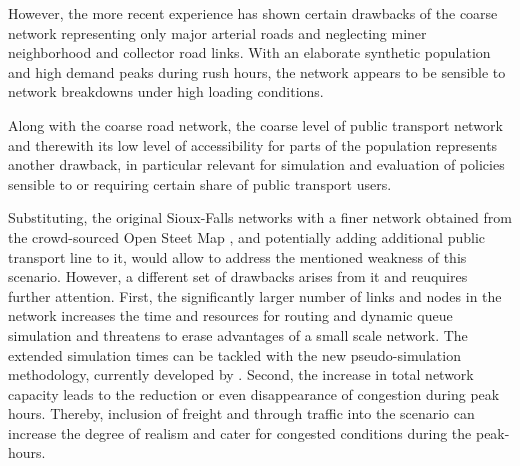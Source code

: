 However, the more recent experience has shown certain drawbacks of the coarse network representing only major arterial roads and neglecting miner neighborhood and collector road links. With an elaborate synthetic population and high demand peaks during rush hours, the network appears to be sensible to network breakdowns under high loading conditions. 

Along with the coarse road network, the coarse level of public transport network and therewith its low level of accessibility for parts of the population represents another drawback, in particular relevant for simulation and evaluation of policies sensible to or requiring certain share of public transport users. 

Substituting, the original Sioux-Falls networks with a finer network obtained from the crowd-sourced Open Steet Map \cite[][]{OpenStreetMap_Webpage_2015}, and potentially adding additional public transport line to it, would allow to address the mentioned weakness of this scenario. However, a different set of drawbacks arises from it and reuquires further attention. First, the significantly larger number of links and nodes in the network increases the time and resources for routing and dynamic queue simulation and threatens to erase advantages of a small scale network. The extended simulation times can be tackled with the new pseudo-simulation methodology, currently developed by \citet[][]{FourieEtAl_TRR_2013}.
Second, the increase in total network capacity leads to the reduction or even disappearance of congestion during peak hours. Thereby, inclusion of freight and through traffic into the scenario can increase the degree of realism and cater for congested conditions during the peak-hours. 

